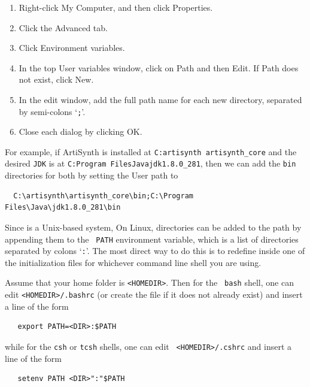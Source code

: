 \begin{enumerate}

\item Right-click {\sf My Computer}, and then click {\sf Properties}.

\item Click the {\sf Advanced} tab.

\item Click {\sf Environment variables}.

\item In the top {\sf User variables} window, click on {\sf Path} and 
then {\sf Edit}. If {\sf Path} does not exist, click {\sf New}.

\item In the edit window, add the full path name for each new directory,
separated by semi-colons `{\tt ;}'.

\item Close each dialog by clicking {\sf OK}.

\end{enumerate}

For example, if ArtiSynth is installed at {\tt C:\BKS artisynth\BKS
artisynth\_core} and the desired {\tt JDK} is at {\tt C:\BKS Program
Files\BKS Java\BKS jdk1.8.0\_281}, then we can add the {\tt bin}
directories for both by setting the User path to
\begin{verbatim}
  C:\artisynth\artisynth_core\bin;C:\Program Files\Java\jdk1.8.0_281\bin
\end{verbatim}

\fi %

\ifWindows\else %

\ifMacOS
Since \SYSTEM{} is a Unix-based system, 
\else\ifLinux
On Linux,
\fi %
\fi %
directories can be added to the path by appending them to the {\tt
PATH} environment variable, which is a list of directories separated
by colons `{\tt :}'. The most direct way to do this is to redefine
\PATH{} inside one of the initialization files for whichever
command line shell you are using.

Assume that your home folder is {\tt <HOMEDIR>}. Then for the {\tt
bash} shell, one can edit {\tt <HOMEDIR>/.bashrc} (or create the file
if it does not already exist) and insert a line of the form
\begin{verbatim}
   export PATH=<DIR>:$PATH
\end{verbatim}
while for the {\tt csh} or {\tt tcsh} shells, one can edit {\tt
<HOMEDIR>/.cshrc} and insert a line of the form
\begin{verbatim}
   setenv PATH <DIR>":"$PATH
\end{verbatim}

